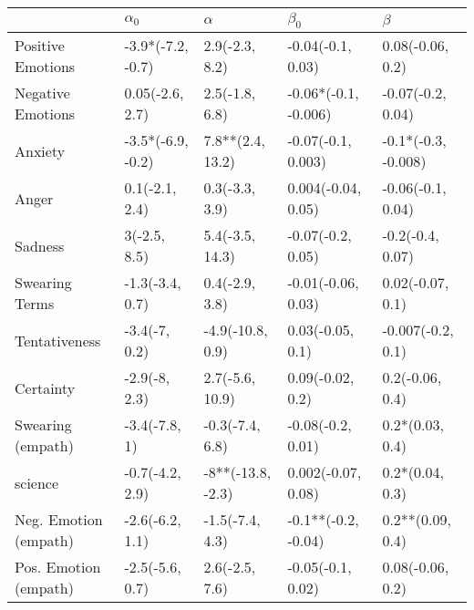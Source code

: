 \begin{tabular}{lllll}
\toprule
{} &         $\alpha_0$ &           $\alpha$ &             $\beta_0$ &              $\beta$ \\
\midrule
Positive Emotions     &  -3.9*(-7.2, -0.7) &     2.9(-2.3, 8.2) &     -0.04(-0.1, 0.03) &     0.08(-0.06, 0.2) \\
Negative Emotions     &    0.05(-2.6, 2.7) &     2.5(-1.8, 6.8) &  -0.06*(-0.1, -0.006) &    -0.07(-0.2, 0.04) \\
Anxiety               &  -3.5*(-6.9, -0.2) &   7.8**(2.4, 13.2) &    -0.07(-0.1, 0.003) &  -0.1*(-0.3, -0.008) \\
Anger                 &     0.1(-2.1, 2.4) &     0.3(-3.3, 3.9) &    0.004(-0.04, 0.05) &    -0.06(-0.1, 0.04) \\
Sadness               &       3(-2.5, 8.5) &    5.4(-3.5, 14.3) &     -0.07(-0.2, 0.05) &     -0.2(-0.4, 0.07) \\
Swearing Terms        &    -1.3(-3.4, 0.7) &     0.4(-2.9, 3.8) &    -0.01(-0.06, 0.03) &     0.02(-0.07, 0.1) \\
Tentativeness         &      -3.4(-7, 0.2) &   -4.9(-10.8, 0.9) &      0.03(-0.05, 0.1) &    -0.007(-0.2, 0.1) \\
Certainty             &      -2.9(-8, 2.3) &    2.7(-5.6, 10.9) &      0.09(-0.02, 0.2) &      0.2(-0.06, 0.4) \\
Swearing (empath)     &      -3.4(-7.8, 1) &    -0.3(-7.4, 6.8) &     -0.08(-0.2, 0.01) &      0.2*(0.03, 0.4) \\
science               &    -0.7(-4.2, 2.9) &  -8**(-13.8, -2.3) &    0.002(-0.07, 0.08) &      0.2*(0.04, 0.3) \\
Neg. Emotion (empath) &    -2.6(-6.2, 1.1) &    -1.5(-7.4, 4.3) &   -0.1**(-0.2, -0.04) &     0.2**(0.09, 0.4) \\
Pos. Emotion (empath) &    -2.5(-5.6, 0.7) &     2.6(-2.5, 7.6) &     -0.05(-0.1, 0.02) &     0.08(-0.06, 0.2) \\
\bottomrule
\end{tabular}
